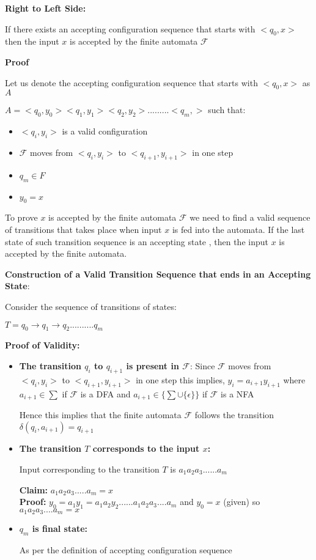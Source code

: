 \documentclass[12pt,a4paper]{article}
\begin{document}
\textbf{Right to Left Side:}

If there exists an accepting configuration sequence that starts with $<q_0,x>$
then the input $x$ is accepted by the finite automata $\mathcal{F}$


\textbf{Proof}

Let us denote the accepting configuration sequence that starts with $<q_0,x>$ as $A$

$A=<q_0,y_0><q_1,y_1><q_2,y_2>.........<q_m,>$ such that:

\begin{itemize}
    \item $<q_i,y_i>$ is a valid configuration
    \item $\mathcal{F}$ moves from $<q_i,y_i>$ to $<q_{i+1},y_{i+1}>$ in one step
    \item $q_m \in F$
    \item $y_0=x$
\end{itemize}

To prove $x$ is accepted by the finite automata $\mathcal{F}$ we need to find a valid sequence of transitions that takes place when input $x$ is fed into the automata. If the last state of such transition sequence is an accepting state , then the input $x$ is accepted by the finite automata.

\textbf{Construction of a Valid Transition Sequence that ends in an Accepting State}:

Consider the sequence of transitions of states:

$T=q_0 \rightarrow q_1 \rightarrow q_2 ..........q_m$

\textbf{Proof of Validity:}
\begin{itemize}
    \item \textbf{The transition $q_i$ to $q_{i+1}$ is present in $\mathcal{F}$}:
Since $\mathcal{F}$ moves from $<q_i,y_i>$ to $<q_{i+1},y_{i+1}>$ in one step this implies, $y_i=a_{i+1}y_{i+1}$  where $a_{i+1} \in \sum$ if $\mathcal{F}$ is a DFA and $a_{i+1} \in  \{\sum \cup \{\epsilon\}\} $ if $\mathcal{F}$ is a NFA

Hence this implies that the finite automata $\mathcal{F}$ follows the transition $\delta(q_i,a_{i+1})=q_{i+1}$
\item \textbf{The transition $T$ corresponds to the input $x$:}

Input corresponding to the transition $T$ is $a_1a_2a_3......a_m$

\textbf{Claim:} $a_1a_2a_3.....a_m=x$\\
\textbf{Proof:} $y_0=a_1y_1=a_1a_2y_2......a_1a_2a_3....a_m$ and $y_0=x$ (given) so $a_1a_2a_3....a_m=x$
\item \textbf{$q_m$ is final state:}


As per the  definition of accepting configuration sequence
\end{itemize}
\end{document}
